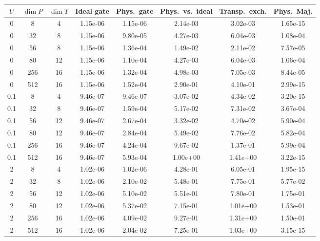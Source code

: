 \begin{tabular}{cccccccc}
\hline
$U$ & $\dim P$ & $\dim T$ & Ideal gate & Phys.\ gate & Phys.\ vs.\ ideal & Transp.\ exch. & Phys.\ Maj. \\
\hline
0 & 8 & 4 & 1.15e-06 & 1.15e-06 & 2.14e-03 & 3.02e-03 & 1.65e-15 \\
0 & 32 & 8 & 1.15e-06 & 9.80e-05 & 4.27e-03 & 6.04e-03 & 1.08e-04 \\
0 & 56 & 8 & 1.15e-06 & 1.36e-04 & 1.49e-02 & 2.11e-02 & 7.57e-05 \\
0 & 80 & 12 & 1.15e-06 & 1.10e-04 & 4.27e-03 & 6.04e-03 & 1.06e-04 \\
0 & 256 & 16 & 1.15e-06 & 1.32e-04 & 4.98e-03 & 7.05e-03 & 8.44e-05 \\
0 & 512 & 16 & 1.15e-06 & 1.52e-04 & 2.90e-01 & 4.10e-01 & 2.99e-15 \\
\hline
0.1 & 8 & 4 & 9.46e-07 & 9.46e-07 & 3.07e-02 & 4.34e-02 & 3.20e-15 \\
0.1 & 32 & 8 & 9.46e-07 & 1.59e-04 & 5.17e-02 & 7.31e-02 & 3.67e-04 \\
0.1 & 56 & 12 & 9.46e-07 & 2.67e-04 & 3.32e-02 & 4.70e-02 & 5.90e-04 \\
0.1 & 80 & 12 & 9.46e-07 & 2.84e-04 & 5.49e-02 & 7.76e-02 & 5.82e-04 \\
0.1 & 256 & 16 & 9.46e-07 & 4.24e-04 & 9.67e-02 & 1.37e-01 & 5.99e-04 \\
0.1 & 512 & 16 & 9.46e-07 & 5.93e-04 & 1.00e+00 & 1.41e+00 & 3.22e-15 \\
\hline
2 & 8 & 4 & 1.02e-06 & 1.02e-06 & 4.28e-01 & 6.05e-01 & 1.95e-15 \\
2 & 32 & 8 & 1.02e-06 & 2.10e-02 & 5.48e-01 & 7.75e-01 & 5.77e-02 \\
2 & 56 & 12 & 1.02e-06 & 5.10e-02 & 5.51e-01 & 7.80e-01 & 1.75e-01 \\
2 & 80 & 12 & 1.02e-06 & 5.37e-02 & 7.15e-01 & 1.01e+00 & 1.53e-01 \\
2 & 256 & 16 & 1.02e-06 & 4.09e-02 & 9.27e-01 & 1.31e+00 & 1.50e-01 \\
2 & 512 & 16 & 1.02e-06 & 2.04e-02 & 7.25e-01 & 1.03e+00 & 3.15e-15 \\
\hline
\end{tabular}
